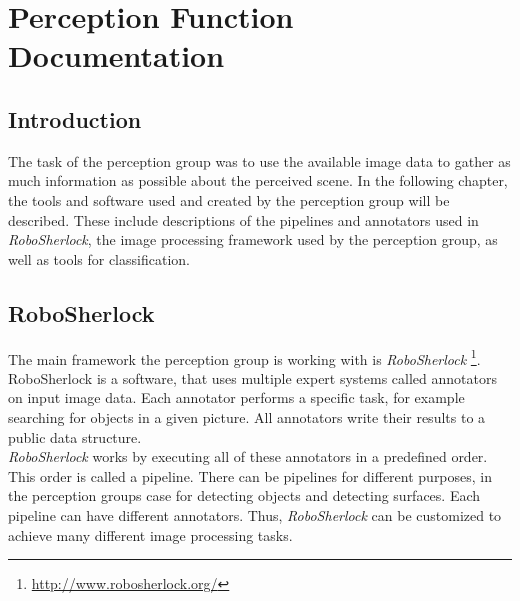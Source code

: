 \documentclass[main.tex]{subfiles}
\begin{document}
\begingroup

\renewcommand{\cleardoublepage}{}

\renewcommand{\clearpage}{}
\newpage
\chapter{Perception Function Documentation}

\section{Introduction}
The task of the perception group was to use the available image data to gather as much information as possible about the perceived scene. In the following chapter, the tools and software used and created by the perception group will be described. These include descriptions of the pipelines and annotators used in \textit{RoboSherlock}, the image processing framework used by the perception group, as well as tools for classification.

\section{RoboSherlock}
The main framework the perception group is working with is \textit{RoboSherlock} \footnote{\url{http://www.robosherlock.org/}}. RoboSherlock is a software, that uses multiple expert systems called annotators on input image data. Each annotator performs a specific task, for example searching for objects in a given picture. All annotators write their results to a public data structure.\\
		
\textit{RoboSherlock} works by executing all of these annotators in a predefined order. This order is called a pipeline. There can be pipelines for different purposes, in the perception groups case for detecting objects and detecting surfaces. Each pipeline can have different annotators. Thus, \textit{RoboSherlock} can be customized to achieve many different image processing tasks.
\end{document}
